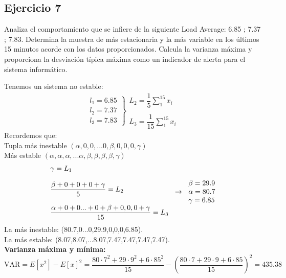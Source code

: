 \subsection{Ejercicio 7}
\noindent
Analiza el comportamiento que se infiere de la siguiente Load Average: 6.85 ; 7.37 ; 7.83. Determina la muestra de más estacionaria y la más variable en los últimos 15 minutos acorde con los datos proporcionados. Calcula la varianza máxima y proporciona la desviación típica máxima como un indicador de alerta para el sistema informático.
\begin{tcolorbox}[colback=white,colframe=cyan!50!black,fonttitle=\bfseries]
Tenemos un sistema no estable:
\[\left.\begin{array}{lll}
l_1=6.85\\
l_2=7.37\\
l_3=7.83
\end{array}\right\rbrace\left.\begin{array}{ll}
L_2=\dfrac{1}{5}\sum_1^{15}x_i\\\\
L_3=\dfrac{1}{15}\sum_1^{15}x_i
\end{array}\right.
\]
Recordemos que:\\
Tupla más inestable $(\alpha,0,0,...0,\beta,0,0,0,\gamma)$\\
Más estable $(\alpha,\alpha,\alpha,...\alpha,\beta,\beta,\beta,\beta,\gamma)$
\[\left.\begin{array}{lll}
\gamma=L_1\\\\
\dfrac{\beta+0+0+0+\gamma}{5}=L_2\\\\
\dfrac{\alpha+0+0...+0+\beta+0,0,0+\gamma}{15}=L_3
\end{array}\right.\rightarrow\left.\begin{array}{lll}
\beta=29.9\\
\alpha=80.7\\
\gamma=6.85
\end{array}\right.
\]
La más inestable: (80.7,0...0,29.9,0,0,0,6.85).\\
La más estable: (8.07,8.07,...8.07,7.47,7.47,7.47,7.47).\\

\textbf{Varianza máxima y mínima:}
\[
\text{VAR}=E[x^2]-E[x]^2=\dfrac{80\cdot 7^2+29\cdot 9^2+6\cdot 85^2}{15}-\left(\dfrac{80\cdot 7+29\cdot 9+6\cdot 85}{15}\right)^2=435.38
\]
\end{tcolorbox}
